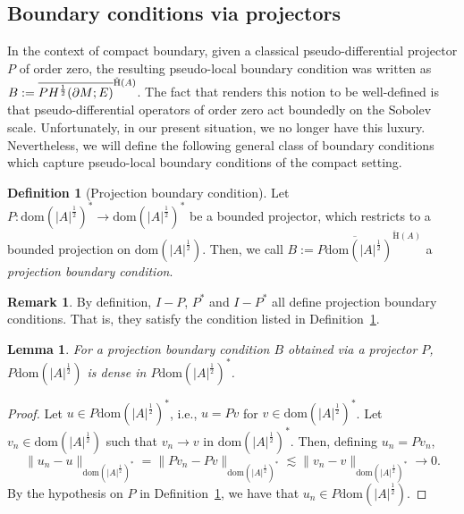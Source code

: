 \documentclass[a4paper,10pt,reqno]{amsart}
\newcommand{\modulus}[1]{|#1|}
\newcommand{\norm}[1]{\| #1 \|}%
\newcommand{\Hard}[2][{}]{{\rm H}^{#2}_{\rm #1}}%
\newcommand{\SobH}[2][{}]{\Hard[#1]{\rm #2}}
\newcommand{\checkH}{\check{\mathrm{H}}}
\newcommand{\dom}{\mathrm{dom}}
\newcommand{\close}[1]{\overline{#1}}
\newcommand{\dM}{\partial M}
\newtheorem{lemma}[theorem]{Lemma}
\theoremstyle{definition}
\newtheorem{definition}[theorem]{Definition}
\newtheorem{remark}[theorem]{Remark}
\begin{document}
\subsection{Boundary conditions via projectors}

In the context of compact boundary, given a classical pseudo-differential projector $P$ of order zero, the resulting pseudo-local boundary condition was written as  $B := \close{P \SobH{\frac12}(\dM;E)}^{\checkH(A)}$.
The fact that renders this notion to be well-defined is that pseudo-differential operators of order zero act boundedly on the Sobolev scale.
Unfortunately, in our present situation, we no longer have this luxury. 
Nevertheless, we will define the following general class of boundary conditions which capture pseudo-local boundary conditions of the compact setting.

\begin{definition}[Projection boundary condition]
\label{Def:ProjBC}
Let $P:  \dom(\modulus{A}^{\frac12})^\ast\to \dom(\modulus{A}^{\frac12})^\ast$ be a bounded projector, which restricts to a bounded projection on $\dom(\modulus{A}^{\frac12})$.
Then, we call  $B := \close{P \dom(\modulus{A}^{\frac12})}^{\checkH(A)}$  a \emph{projection boundary condition}.
\end{definition}

\begin{remark}
\label{Rem:ProjBC}
By definition, $I-P$, $P^\ast$ and $I-P^\ast$ all define projection boundary conditions.
That is, they satisfy the condition listed in Definition~\ref{Def:ProjBC}.
\end{remark}

\begin{lemma}
\label{Lem:ProjBCDensity}
For a projection boundary condition $B$ obtained via a projector $P$, $P\dom(\modulus{A}^{\frac12})$ is dense in $P\dom(\modulus{A}^{\frac12})^\ast$.
\end{lemma}
\begin{proof}
Let $u \in P \dom(\modulus{A}^{\frac12})^\ast$, i.e., $u = Pv$ for $v \in \dom(\modulus{A}^{\frac12})^\ast$.
Let $v_n \in \dom(\modulus{A}^{\frac12})$ such that $v_n \to v$ in $\dom(\modulus{A}^{\frac12})^\ast$.
Then, defining $u_n = Pv_n$,
$$ \norm{u_n - u}_{\dom(\modulus{A}^{\frac12})^\ast} = \norm{Pv_n - Pv}_{\dom(\modulus{A}^{\frac12})^\ast} \lesssim \norm{v_n -v}_{\dom(\modulus{A}^{\frac12})^\ast} \to 0.$$
By the hypothesis on $P$ in Definition~\ref{Def:ProjBC}, we have that $u_n \in P\dom(\modulus{A}^{\frac12})$.
\end{proof}
\end{document}
